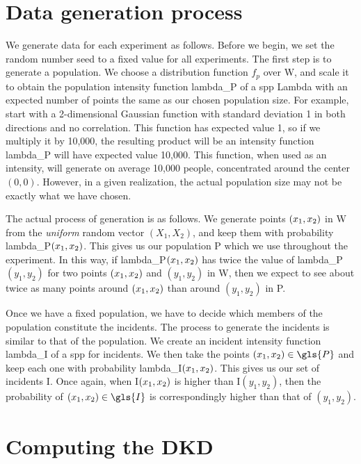 \section{Data generation process}
\label{sec:method:data generation}

We generate data for each experiment as follows.
Before we begin, we set the random number seed to a fixed value for all experiments.
The first step is to generate a population.
We choose a distribution function $f_p$ over \gls{W},
and scale it to obtain the population intensity function \gls{lambda_P} of a \gls{spp} \gls{Lambda}
with an expected number of points the same as our chosen population size.
For example,
start with a 2-dimensional Gaussian function with standard deviation 1 in both directions and no correlation.
This function has expected value 1, so if we multiply it by 10,000,
the resulting product will be an intensity function \gls{lambda_P} will have expected value 10,000.
This function,
when used as an intensity,
will generate on average 10,000 people,
concentrated around the center $(0,0)$.
However, in a given realization,
the actual population size may not be exactly what we have chosen.

The actual process of generation is as follows.
We generate points $(x_1, x_2)$ in \gls{W} from the \textit{uniform} random vector $(X_1,X_2)$,
and keep them with probability \gls{lambda_P}$(x_1, x_2)$.
This gives us our population \gls{P} which we use throughout the experiment.
In this way,
if \gls{lambda_P}$(x_1, x_2)$ has twice the value of \gls{lambda_P}$(y_1, y_2)$ for two points $(x_1, x_2)$ and $(y_1, y_2)$ in \gls{W},
then we expect to see about twice as many points around $(x_1, x_2)$ than around $(y_1, y_2)$ in \gls{P}.

Once we have a fixed population, we have to decide which members of the population constitute the incidents.
The process to generate the incidents is similar to that of the population.
We create an incident intensity function \gls{lambda_I} of a \gls{spp} for incidents.
We then take the points $\xvec \in \gls{P}$ and keep each one with probability \gls{lambda_I}$(x_1, x_2)$.
This gives us our set of incidents \gls{I}.
Once again, when \gls{I}$(x_1, x_2)$ is higher than \gls{I}$(y_1, y_2)$,
then the probability of $\xvec \in \gls{I}$ is correspondingly higher than that of $(y_1, y_2)$.

\section{Computing the DKD}
\label{sec:method:computing}

